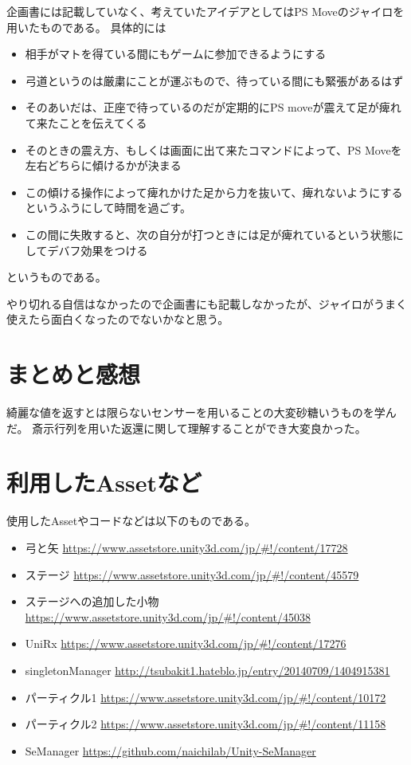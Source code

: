 \documentclass[11pt,a4j]{jsarticle}
\begin{document}
企画書には記載していなく、考えていたアイデアとしてはPS Moveのジャイロを用いたものである。
具体的には
\begin{itemize}
  \item 相手がマトを得ている間にもゲームに参加できるようにする
  \item 弓道というのは厳粛にことが運ぶもので、待っている間にも緊張があるはず
  \item そのあいだは、正座で待っているのだが定期的にPS moveが震えて足が痺れて来たことを伝えてくる
  \item そのときの震え方、もしくは画面に出て来たコマンドによって、PS Moveを左右どちらに傾けるかが決まる
  \item この傾ける操作によって痺れかけた足から力を抜いて、痺れないようにするというふうにして時間を過ごす。
  \item この間に失敗すると、次の自分が打つときには足が痺れているという状態にしてデバフ効果をつける
\end{itemize}
というものである。

やり切れる自信はなかったので企画書にも記載しなかったが、ジャイロがうまく使えたら面白くなったのでないかなと思う。

\section{まとめと感想}

綺麗な値を返すとは限らないセンサーを用いることの大変砂糖いうものを学んだ。
斎示行列を用いた返還に関して理解することができ大変良かった。


\section{利用したAssetなど}
使用したAssetやコードなどは以下のものである。

\begin{itemize}
  \item 弓と矢
  \url{https://www.assetstore.unity3d.com/jp/#!/content/17728}
  \item ステージ
  \url{https://www.assetstore.unity3d.com/jp/#!/content/45579}
  \item ステージへの追加した小物
  \url{https://www.assetstore.unity3d.com/jp/#!/content/45038}
  \item UniRx
  \url{https://www.assetstore.unity3d.com/jp/#!/content/17276}
  \item singletonManager
  \url{http://tsubakit1.hateblo.jp/entry/20140709/1404915381}
  \item パーティクル1
  \url{https://www.assetstore.unity3d.com/jp/#!/content/10172}
  \item パーティクル2
  \url{https://www.assetstore.unity3d.com/jp/#!/content/11158}
  \item SeManager
  \url{https://github.com/naichilab/Unity-SeManager}
\end{itemize}
\end{document}
